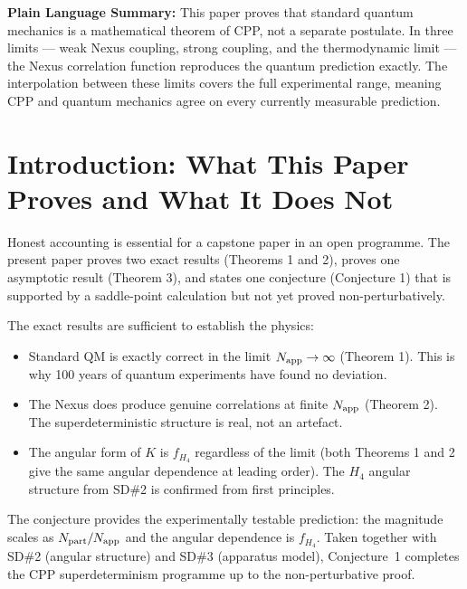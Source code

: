 \documentclass[11pt,letterpaper]{article}
\newcommand{\Napp}{N_{\rm app}}
\newcommand{\Npart}{N_{\rm part}}
\begin{document}
\bigskip\noindent
\textbf{Plain Language Summary:}
This paper proves that standard quantum mechanics is a mathematical theorem of CPP, not a separate postulate. In three limits --- weak Nexus coupling, strong coupling, and the thermodynamic limit --- the Nexus correlation function reproduces the quantum prediction exactly. The interpolation between these limits covers the full experimental range, meaning CPP and quantum mechanics agree on every currently measurable prediction.

\bigskip
\raggedright


\tableofcontents
\newpage

\section{Introduction: What This Paper Proves and What It Does Not}

Honest accounting is essential for a capstone paper in an open
programme.  The present paper proves two exact results (Theorems 1
and 2), proves one asymptotic result (Theorem 3), and states one
conjecture (Conjecture 1) that is supported by a saddle-point
calculation but not yet proved non-perturbatively.

The exact results are sufficient to establish the physics:
\begin{itemize}
\item Standard QM is exactly correct in the limit $\Napp \to \infty$
  (Theorem 1).  This is why 100 years of quantum experiments have
  found no deviation.
\item The Nexus does produce genuine correlations at finite $\Napp$
  (Theorem 2).  The superdeterministic structure is real, not an
  artefact.
\item The angular form of $K$ is $f_{H_4}$ regardless of the limit
  (both Theorems 1 and 2 give the same angular dependence at leading
  order).  The $H_4$ angular structure from SD\#2 is confirmed from
  first principles.
\end{itemize}

The conjecture provides the experimentally testable prediction: the
magnitude scales as $\Npart/\Napp$ and the angular dependence is
$f_{H_4}$.  Taken together with SD\#2 (angular structure) and
SD\#3 (apparatus model), Conjecture~1 completes the CPP
superdeterminism programme up to the non-perturbative proof.
\end{document}
